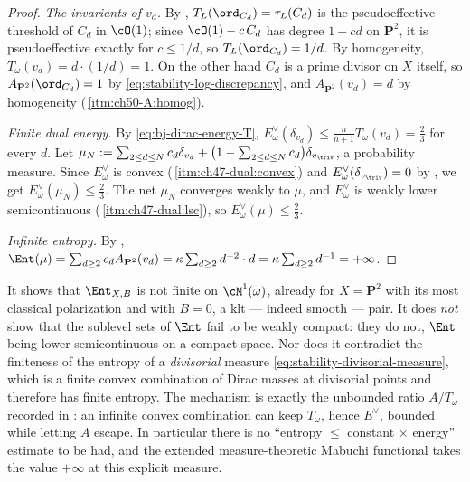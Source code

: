 \begin{proof}
\emph{The invariants of $v_d$.}  By
, $T_L(\ord_{C_d})=\tau_L(C_d)$ is the
pseudoeffective threshold of $C_d$ in $\cO(1)$; since
$\cO(1)-c\,C_d$ has degree $1-cd$ on $\mathbf P^2$, it is
pseudoeffective exactly for $c\le1/d$, so $T_L(\ord_{C_d})=1/d$.  By
homogeneity, $T_\omega(v_d)=d\cdot(1/d)=1$.  On the other hand
$C_d$ is a prime divisor on $X$ itself, so
$A_{\mathbf P^2}(\ord_{C_d})=1$ by
\eqref{eq:stability-log-discrepancy}, and
$A_{\mathbf P^2}(v_d)=d$ by homogeneity
(\,\cref{itm:ch50-A:homog}).

\emph{Finite dual energy.}  By \eqref{eq:bj-dirac-energy-T},
$E^\vee_\omega(\delta_{v_d})\le\frac{n}{n+1}T_\omega(v_d)
=\frac23$ for every $d$.  Let
$\mu_N:=\sum_{2\le d\le N}c_d\delta_{v_d}
+\bigl(1-\sum_{2\le d\le N}c_d\bigr)\delta_{v_{\triv}}$, a probability
measure.  Since $E^\vee_\omega$ is convex
(\,\cref{itm:ch47-dual:convex}) and
$E^\vee_\omega(\delta_{v_{\triv}})=0$ by
, we get $E^\vee_\omega(\mu_N)\le\frac23$.  The
net $\mu_N$ converges weakly to $\mu$, and $E^\vee_\omega$ is weakly
lower semicontinuous
(\,\cref{itm:ch47-dual:lsc}), so
$E^\vee_\omega(\mu)\le\frac23$.

\emph{Infinite entropy.}  By ,
$\Ent(\mu)=\sum_{d\ge2}c_dA_{\mathbf P^2}(v_d)
=\kappa\sum_{d\ge2}d^{-2}\cdot d=\kappa\sum_{d\ge2}d^{-1}=+\infty$.
\end{proof}

\begin{remark}
\label{rem:ch50-infinite-entropy-scope}
It shows that $\Ent_{X,B}$ is not finite on $\cM^1(\omega)$, already
for $X=\mathbf P^2$ with its most classical polarization and with
$B=0$, a klt --- indeed smooth --- pair.  It does \emph{not} show that
the sublevel sets of $\Ent$ fail to be weakly compact: they do not,
$\Ent$ being lower semicontinuous on a compact space.  Nor does it
contradict the finiteness of the entropy of a \emph{divisorial} measure
\eqref{eq:stability-divisorial-measure}, which is a finite convex
combination of Dirac masses at divisorial points and therefore has finite
entropy.  The mechanism is exactly the unbounded ratio
$A/T_\omega$ recorded in : an infinite convex
combination can keep $T_\omega$, hence $E^\vee$, bounded while letting
$A$ escape.  In particular there is no ``entropy $\le$ constant
$\times$ energy'' estimate to be had, and the extended measure-theoretic Mabuchi functional takes the value
$+\infty$ at this explicit measure.
\end{remark}

